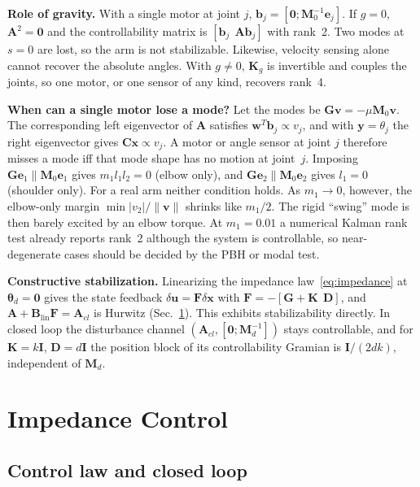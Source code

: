 \documentclass[letterpaper, 10pt, conference]{ieeeconf}
\begin{document}
\textbf{Role of gravity.} With a single motor at joint $j$,
$\mathbf{b}_j=[\mathbf{0};\mathbf{M}_0^{-1}\mathbf{e}_j]$. If $g=0$,
$\mathbf{A}^2=\mathbf{0}$ and the controllability matrix is
$[\mathbf{b}_j\ \ \mathbf{A}\mathbf{b}_j]$ with rank~2. Two modes at
$s=0$ are lost, so the arm is not stabilizable. Likewise,
velocity sensing alone cannot recover the absolute angles. With
$g\neq0$, $\mathbf{K}_g$ is invertible and couples the joints, so
one motor, or one sensor of any kind, recovers rank~4.

\textbf{When can a single motor lose a mode?} Let the modes be
$\mathbf{G}\mathbf{v}=-\mu\mathbf{M}_0\mathbf{v}$. The corresponding left
eigenvector of $\mathbf{A}$ satisfies
$\mathbf{w}^{T}\mathbf{b}_j\propto v_j$, and with
$\mathbf{y}=\theta_j$ the right eigenvector gives
$\mathbf{C}\mathbf{x}\propto v_j$. A motor or angle sensor at joint
$j$ therefore misses a mode iff that mode shape has no motion at
joint~$j$. Imposing $\mathbf{G}\mathbf{e}_1\parallel\mathbf{M}_0\mathbf{e}_1$
gives $m_1l_1l_2=0$ (elbow only), and
$\mathbf{G}\mathbf{e}_2\parallel\mathbf{M}_0\mathbf{e}_2$ gives $l_1=0$
(shoulder only). For a real arm neither condition holds. As
$m_1\to0$, however, the elbow-only margin $\min|v_2|/\|\mathbf{v}\|$
shrinks like $m_1/2$. The rigid ``swing'' mode is then barely
excited by an elbow torque. At $m_1=0.01$ a numerical Kalman rank
test already reports rank~2 although the system is controllable,
so near-degenerate cases should be decided by the PBH or modal
test.

\textbf{Constructive stabilization.} Linearizing the impedance
law~\eqref{eq:impedance} at $\boldsymbol{\theta}_d=\mathbf{0}$ gives the
state feedback
$\delta\mathbf{u}=\mathbf{F}\delta\mathbf{x}$ with
$\mathbf{F}=-[\mathbf{G}+\mathbf{K}\ \ \mathbf{D}]$, and
$\mathbf{A}+\mathbf{B}_{\mathrm{lin}}\mathbf{F}=\mathbf{A}_{cl}$ is Hurwitz
(Sec.~\ref{sec:impedance}). This exhibits stabilizability
directly. In closed loop the disturbance channel
$(\mathbf{A}_{cl},[\mathbf{0};\mathbf{M}_d^{-1}])$ stays controllable,
and for $\mathbf{K}=k\mathbf{I}$, $\mathbf{D}=d\mathbf{I}$ the position
block of its controllability Gramian is $\mathbf{I}/(2dk)$,
independent of $\mathbf{M}_d$.

\section{Impedance Control}
\label{sec:impedance}

\subsection{Control law and closed loop}
\end{document}
